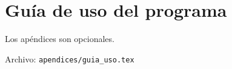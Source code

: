
\chapter{Guía de uso del programa}\label{ap:apendice2}

Los apéndices son opcionales.

Archivo: \texttt{apendices/guia\_uso.tex}

\endinput
